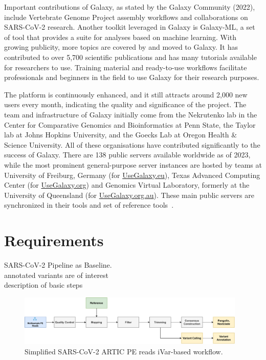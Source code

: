 Important contributions of Galaxy, as stated by the Galaxy Community (2022), include Vertebrate Genome Project assembly workflows and collaborations on SARS-CoV-2 research. Another toolkit leveraged in Galaxy is Galaxy-ML, a set of tool that provides a suite for analyses based on machine learning. With growing publicity, more topics are covered by and moved to Galaxy. It has contributed to over 5,700 scientific publications and has many tutorials available for researchers to use. Training material and ready-to-use workflows facilitate professionals and beginners in the field to use Galaxy for their research purposes.

The platform is continuously enhanced, and it still attracts around 2,000 new users every month, indicating the quality and significance of the project. The team and infrastructure of Galaxy initially come from the Nekrutenko lab in the Center for Comparative Genomics and Bioinformatics at Penn State, the Taylor lab at Johns Hopkins University, and the Goecks Lab at Oregon Health \& Science University. All of these organisations have contributed significantly to the success of Galaxy. There are 138 public servers available worldwide as of 2023, while the most prominent general-purpose server instances are hosted by teams at University of Freiburg, Germany (for \href{https://usegalaxy.eu/}{UseGalaxy.eu}), Texas Advanced Computing Center (for \href{https://usegalaxy.org/}{UseGalaxy.org}) and Genomics Virtual Laboratory, formerly at the University of Queensland (for \href{https://usegalaxy.org.au/}{UseGalaxy.org.au}). These main public servers are synchronized in their tools and set of reference tools~\cite{10.1093/nar/gkac247}.

\section{Requirements}

SARS-CoV-2 Pipeline as Baseline. \\
annotated variants are of interest \\
description of basic steps

\begin{figure}
	\centering
	\includegraphics[width=0.97\textwidth]{media/3-pipelines-SARS-CoV-2.pdf}
	\caption{Simplified SARS-CoV-2 ARTIC PE reads iVar-based workflow.}
	\label{fig:3-pipelines-sars}
\end{figure}


